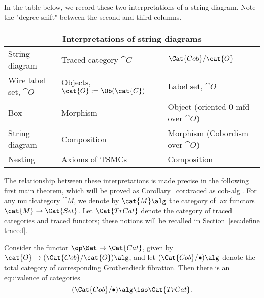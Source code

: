 In the table below, we record these two interpretations of a string diagram. Note the "degree shift" between the second and third columns.
\begin{center}
\begin{tabular}{lll}
\toprule
\multicolumn{3}{c}{Interpretations of string diagrams} \\
\midrule
String diagram & Traced category $\cat{C}$ & $\Cat{Cob}/\cat{O}$ \\
\midrule
Wire label set, $\cat{O}$ & Objects, $\cat{O}:=\Ob(\cat{C})$ & Label set, $\cat{O}$ \\
Box & Morphism & Object (oriented 0-mfd over $\cat{O}$) \\
String diagram & Composition & Morphism (Cobordism over $\cat{O}$) \\
Nesting & Axioms of TSMCs & Composition \\
\bottomrule
\end{tabular}
\end{center}

The relationship between these interpretations is made precise in the following first main theorem, which will be proved as Corollary~\ref{cor:traced as cob-alg}. For any multicategory $\cat{M}$, we denote by $\cat{M}\alg$ the category of lax functors $\cat{M}\to\Cat{Set}$. Let $\Cat{TrCat}$ denote the category of traced categories and traced functors; these notions will be recalled in Section~\ref{sec:define traced}.

\begin{theorem}\label{thm:traced as cob-alg}
Consider the functor $\op\Set\to\Cat{Cat}$, given by $\cat{O}\mapsto(\Cat{Cob}/\cat{O})\alg$, and let $(\Cat{Cob}/\bullet)\alg$ denote the total category of corresponding Grothendieck fibration. Then there is an equivalence of categories
$$(\Cat{Cob}/\bullet)\alg\iso\Cat{TrCat}.$$
\end{theorem}

